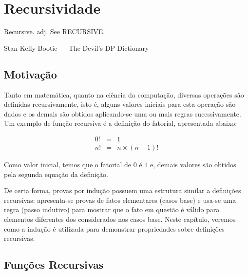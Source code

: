 \chapter{Recursividade}\label{cap10}

\epigraph{Recursive. adj. See RECURSIVE.}{Stan Kelly-Bootie --- The
  Devil's DP Dictionary}

\section{Motivação}

Tanto em matemática, quanto na ciência da computação, diversas
operações são definidas recursivamente, isto é, alguns valores
iniciais para esta operação são dados e os demais são obtidos
aplicando-se uma ou mais regras sucessivamente. Um exemplo de função
recursiva é a definição do fatorial, apresentada abaixo:

\[
\begin{array}{lcl}
0! & = & 1\\
n! & = & n \times (n - 1)!
\end{array}
\]

Como valor inicial, temos que o fatorial de $0$ é $1$ e, demais
valores são obtidos pela segunda equação da definição.

De certa forma, provas por indução possuem uma estrutura similar a
definições recursivas: apresenta-se provas de fatos elementares (casos
base) e usa-se uma regra (passo indutivo) para mostrar que o fato em
questão é válido para elementos diferentes dos considerados nos casos
base. Neste capítulo, veremos como a indução é utilizada para
demonstrar propriedades sobre definições recursivas.

\section{Funções Recursivas}

